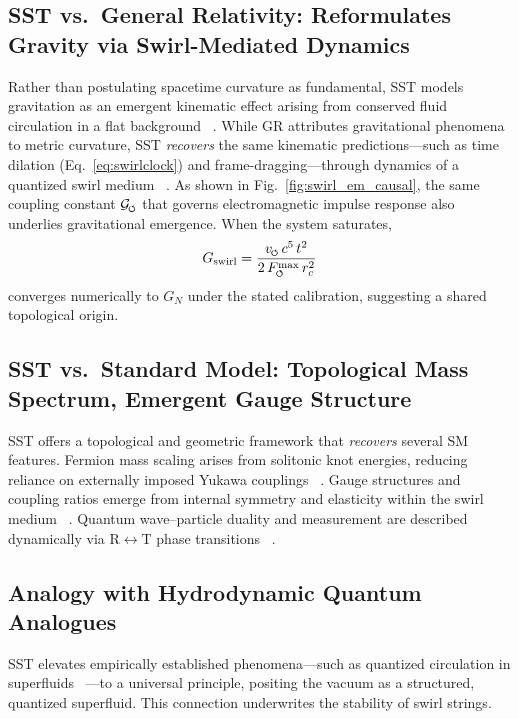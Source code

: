 \documentclass[10pt,reprint,aps,onecolumn,nofootinbib]{revtex4-2}
\newcommand{\Fmaxswirl}{F^{\max}_{\mkern-1mu\scriptscriptstyle\boldsymbol{\circlearrowleft}}}
\begin{document}
    \subsection*{SST vs.\ General Relativity: Reformulates Gravity via Swirl-Mediated Dynamics}
        Rather than postulating spacetime curvature as fundamental, SST models gravitation as an emergent kinematic effect arising from conserved fluid circulation in a flat background~ \cite{chiralSwirl}. While GR attributes gravitational phenomena to metric curvature, SST \emph{recovers} the same kinematic predictions—such as time dilation (Eq.~\ref{eq:swirlclock}) and frame-dragging—through dynamics of a quantized swirl medium~ \cite{sstCanon}. As shown in Fig.~\ref{fig:swirl_em_causal}, the same coupling constant \(\mathcal{G}_{\mkern-2mu\scriptscriptstyle\boldsymbol{\circlearrowleft}}\) that governs electromagnetic impulse response also underlies gravitational emergence. When the system saturates,
        \[
            G_{\mathrm{swirl}} = \frac{v_{\mkern-2mu\scriptscriptstyle\boldsymbol{\circlearrowleft}} \, c^5 \, t^2}{2 \, \Fmaxswirl \, r_c^2}
        \]
        converges numerically to \(G_N\) under the stated calibration, suggesting a shared topological origin.

    \subsection*{SST vs.\ Standard Model: Topological Mass Spectrum, Emergent Gauge Structure}
        SST offers a topological and geometric framework that \emph{recovers} several SM features. Fermion mass scaling arises from solitonic knot energies, reducing reliance on externally imposed Yukawa couplings~ \cite{sstLagrangian}. Gauge structures and coupling ratios emerge from internal symmetry and elasticity within the swirl medium~ \cite{sstLagrangian}. Quantum wave–particle duality and measurement are described dynamically via R$\leftrightarrow$T phase transitions~ \cite{sstCanon}.

    \subsection*{Analogy with Hydrodynamic Quantum Analogues}
        SST elevates empirically established phenomena—such as quantized circulation in superfluids~ \cite{sstCanon}—to a universal principle, positing the vacuum as a structured, quantized superfluid. This connection underwrites the stability of swirl strings.
\end{document}
